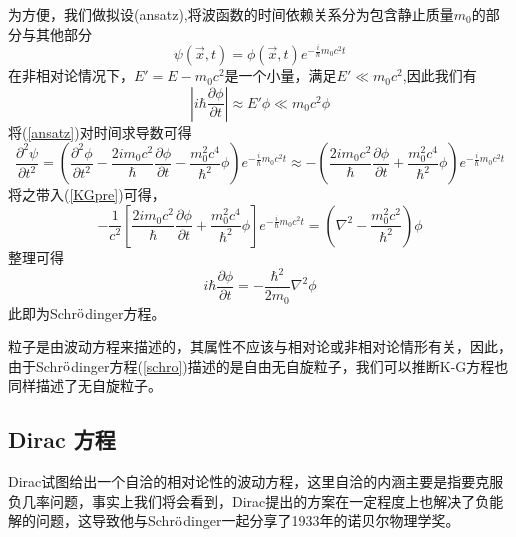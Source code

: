 为方便，我们做拟设(ansatz),将波函数的时间依赖关系分为包含静止质量$m_{0}$的部分与其他部分
\begin{equation}
\label{ansatz}
    \psi(\vec{x},t)=\phi(\vec{x},t)e^{-\frac{i}{\hbar}m_{0}c^{2}t}
\end{equation}
在非相对论情况下，$E'=E-m_{0}c^{2}$是一个小量，满足$E' \ll m_{0}c^{2}$,因此我们有
\begin{equation}
    \left|i\hbar \frac{\partial \phi}{\partial t}\right| \approx E'\phi \ll m_{0}c^{2}\phi
\end{equation}
将(\ref{ansatz})对时间求导数可得
\begin{equation}
    \frac{\partial^{2} \psi}{\partial t^{2}}=\left( \frac{\partial^{2} \phi}{\partial t^{2}}-\frac{2i m_{0}c^{2}}{\hbar}\frac{\partial \phi}{\partial t} -\frac{m_{0}^{2}c^{4}}{\hbar^{2}}\phi\right)e^{-\frac{i}{\hbar}m_{0}c^{2}t}\approx -\left( \frac{2i m_{0}c^{2}}{\hbar}\frac{\partial \phi}{\partial t} +\frac{m_{0}^{2}c^{4}}{\hbar^{2}}\phi\right)e^{-\frac{i}{\hbar}m_{0}c^{2}t}
\end{equation}
将之带入(\ref{KGpre})可得，
\begin{equation}
-\frac{1}{c^{2}}\left[ \frac{2i m_{0}c^{2}}{\hbar}\frac{\partial \phi}{\partial t} +\frac{m_{0}^{2}c^{4}}{\hbar^{2}}\phi\right]e^{-\frac{i}{\hbar}m_{0}c^{2}t}=(\nabla^{2}-\frac{m_{0}^{2}c^{2}}{\hbar^{2}})\phi
\end{equation}
整理可得
\begin{equation}
\label{schro}
    i\hbar\frac{\partial\phi}{\partial t}=-\frac{\hbar^{2}}{2m_{0}}\nabla^{2}\phi
\end{equation}
此即为Schr$\ddot{\rm{o}}$dinger方程。

粒子是由波动方程来描述的，其属性不应该与相对论或非相对论情形有关，因此，由于Schr$\ddot{\rm{o}}$dinger方程(\ref{schro})描述的是自由无自旋粒子，我们可以推断K-G方程也同样描述了无自旋粒子。



\subsection{Dirac 方程}
Dirac试图给出一个自洽的相对论性的波动方程，这里自洽的内涵主要是指要克服负几率问题，事实上我们将会看到，Dirac提出的方案在一定程度上也解决了负能解的问题，这导致他与Schr$\ddot{\rm{o}}$dinger一起分享了1933年的诺贝尔物理学奖。

